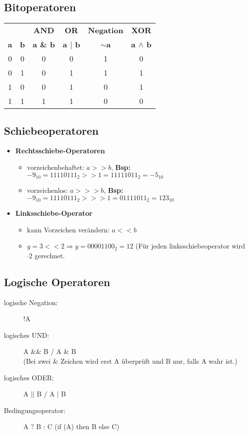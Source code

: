 \documentclass[a4paper,10pt]{article}
\newcommand{\Bold}[1]{\textbf{#1}} %
\newcommand{\Ra}{\Rightarrow}
\begin{document}
\subsection{Bitoperatoren}
\begin{tabular}{|c|c|c|c|c|c|}
	\hline
	& & \Bold {AND} & \Bold {OR} & \Bold {Negation} & \Bold {XOR} \\
	\Bold {a} & \Bold {b} & \Bold {a \& b} & \Bold {a $|$ b} & \Bold {$\sim$a} & \Bold {a $\wedge$  b} \\
	\hline
	0 & 0 & 0 & 0 & 1 & 0 \\
	0 & 1 & 0 & 1 & 1 & 1 \\
	1 & 0 & 0 & 1 & 0 & 1 \\
	1 & 1 & 1 & 1 & 0 & 0 \\
	\hline
\end{tabular}

\subsection{Schiebeoperatoren}
\begin{itemize}
	\item \Bold {Rechtsschiebe-Operatoren}
		\begin{itemize}
			\item vorzeichenbehaftet: $a >> b$, \Bold{Bsp:}$-9_{10} = 11110111_2 >> 1 = 11111011_2 = -5_{10}$
			\item vorzeichenlos: $a >>> b$, \Bold{Bsp:}$-9_{10} =  11110111_2 >>> 1 = 01111011_2 = 123_{10}$ 
		\end{itemize}
	\item \Bold {Linksschiebe-Operator}
		\begin{itemize}
			\item kann Vorzeichen ver\"andern:  $a << b$
			\item $y=3<<2\Ra y=00001100_2=12$ (F\"ur jeden linksschiebeoperator wird $\cdot 2$ gerechnet.
		\end{itemize}
\end{itemize}

\subsection{Logische Operatoren}
\begin{description}
	\item[logische Negation:] !A
	\item[logisches UND:] A \&\& B  / A \& B \\
				(Bei zwei \& Zeichen wird erst A \"uberpr\"uft und B nur, falls A wahr ist.)
	\item[logisches ODER:] A $||$ B / A $|$ B
	\item[Bedingungsoperator:] A ? B : C (if (A) then B else C)
\end{description}
\end{document}

